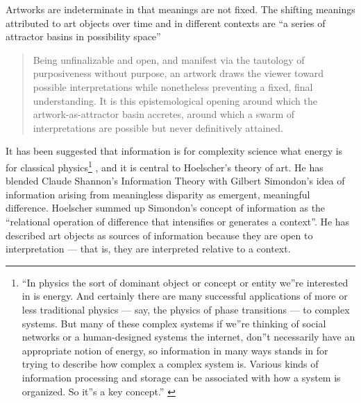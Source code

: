 \documentclass[letterpaper]{article}
\begin{document}
    Artworks are indeterminate in that meanings are not fixed. The shifting meanings attributed to art objects over time and in different contexts are “a series of attractor basins in possibility space” \citep[p.4]{HoelscherThPtcsOfPhsSpc2014}
    
    \begin{quote}
        Being unfinalizable and open, and manifest via the tautology of purposiveness without purpose, an artwork draws the viewer toward possible interpretations while nonetheless preventing a fixed, final understanding. It is this epistemological opening around which the artwork-as-attractor basin accretes, around which a swarm of interpretations are possible but never definitively attained. \citep[p.12]{HoelscherThPtcsOfPhsSpc2014}
    \end{quote}

    It has been suggested that information is for complexity science what energy is for classical physics\footnote{
        “In physics the sort of dominant object or concept or entity we”re interested in is energy. And certainly there are many successful applications of more or less traditional physics — say, the physics of phase transitions — to complex systems. But many of these complex systems if we”re thinking of social networks or a human-designed systems the internet, don”t necessarily have an appropriate notion of energy, so information in many ways stands in for trying to describe how complex a complex system is. Various kinds of information processing and storage can be associated with how a system is organized.  So it”s a key concept.” \citep[0:52]{CrutchfieldIntrdctnToCmplxty2018}
    } \citep{CrutfieldRtAlSgntrsOfInfnty2015}, and it is central to Hoelscher's theory of art. He has blended Claude Shannon's Information Theory with Gilbert Simondon's idea of information arising from meaningless disparity as emergent, meaningful difference. Hoelscher summed up Simondon's concept of information as the “relational operation of difference that intensifies or generates a context”. He has described art objects as sources of information because they are open to interpretation — that is, they are interpreted relative to a context. 
    
    
\end{document}
